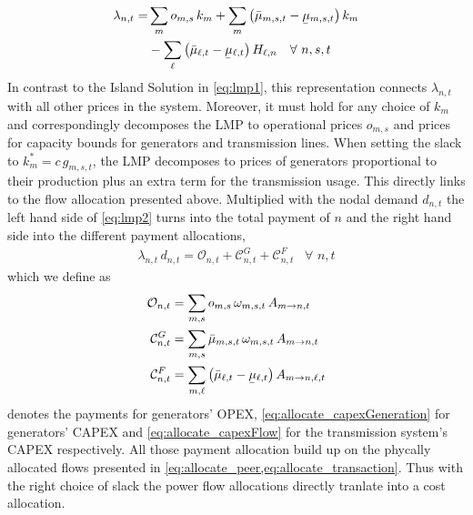 \documentclass[11pt,twocolumn]{article}
\newcommand{\ubar}[1]{\underaccent{\bar}{#1}}
\newcommand{\generation}[1][n]{g_{#1,s,t}}
\newcommand{\generationshare}[1][n]{\omega_{#1,s,t}}
\newcommand{\opexGeneration}[1][n]{o_{#1,s}}
\newcommand{\nodaldemand}[1][n]{d_{#1,t}}
\newcommand{\ptdf}[1][n]{H_{\ell,#1}}
\newcommand{\slack}[1][n]{k_{#1}}
\newcommand{\slackk}[1][n]{k^*_{#1}}
\newcommand{\mulowergeneration}[1][n]{\ubar{\mu}_{#1,s,t}}
\newcommand{\muuppergeneration}[1][n]{\bar{\mu}_{#1,s,t}}
\newcommand{\mulowerflow}{\ubar{\mu}_{\ell,t}}
\newcommand{\muupperflow}{\bar{\mu}_{\ell,t}}
\newcommand{\lmp}[1][n]{\lambda_{#1,t}}
\newcommand{\allocatePeer}[1][m \rightarrow n]{A_{#1,t}}
\newcommand{\allocateTransaction}[1][m \rightarrow n]{A_{#1,\ell,t}}
\newcommand{\allocateCapexGeneration}[1][n]{\mathcal{C}^{G}_{#1,t}}
\newcommand{\allocateCapexFlow}[1][n]{\mathcal{C}^{F}_{#1,t}}
\newcommand{\allocateOpex}[1][n]{\mathcal{O}_{#1,t}}
\newcommand{\Forall}[1]{\hspace{10pt} \forall \,\, #1 }
\begin{document}
\begin{align}
\notag
\lmp =&  \sum_m \opexGeneration[m]\, \slack[m]  + \sum_m \left( \muuppergeneration[m] - \mulowergeneration[m] \right) \slack[m] \\
& -\sum_\ell \left( \muupperflow - \mulowerflow\right) \ptdf  \Forall{n,s,t} 
\label{eq:lmp2}
\end{align}
%  
In contrast to the Island Solution in \cref{eq:lmp1}, this representation connects $\lmp$ with all other prices in the system. Moreover, it must hold for any choice of $\slack[m]$ and correspondingly decomposes the LMP to operational prices $\opexGeneration[m]$ and prices for capacity bounds for generators and transmission lines. When setting the slack to $\slackk[m] = c \, \generation[m]$, the LMP decomposes to prices of generators proportional to their production plus an extra term for the transmission usage. This directly links to the flow allocation presented above. Multiplied with the nodal demand $\nodaldemand$ the left hand side of \cref{eq:lmp2} turns into the total payment of $n$ and the right hand side into the different payment allocations, 
\begin{align}
 \lmp \, \nodaldemand = \allocateOpex + \allocateCapexGeneration + \allocateCapexFlow \Forall{n,t}
 \label{eq:lmp_allocation}
\end{align}
which we define as  
\begin{align}
 \allocateOpex &= 
 \sum_{m,s} \opexGeneration[m] \, \generationshare[m] \, \allocatePeer 
\label{eq:allocate_opexGeneration}\\
 \allocateCapexGeneration &= 
 \sum_{m,s} \muuppergeneration[m] \, \generationshare[m] \, \allocatePeer
\label{eq:allocate_capexGeneration} \\
 \allocateCapexFlow &=  
 \sum_{m,\ell} \left( \muupperflow - \mulowerflow\right) \allocateTransaction  
\label{eq:allocate_capexFlow}
\end{align}
 denotes the payments for generators' OPEX, \cref{eq:allocate_capexGeneration} for generators' CAPEX and \cref{eq:allocate_capexFlow} for the transmission system's CAPEX respectively. All those payment allocation build up on the phycally allocated flows presented in \cref{eq:allocate_peer,eq:allocate_transaction}. Thus with the right choice of slack the power flow allocations directly tranlate into a cost allocation.
\end{document}
